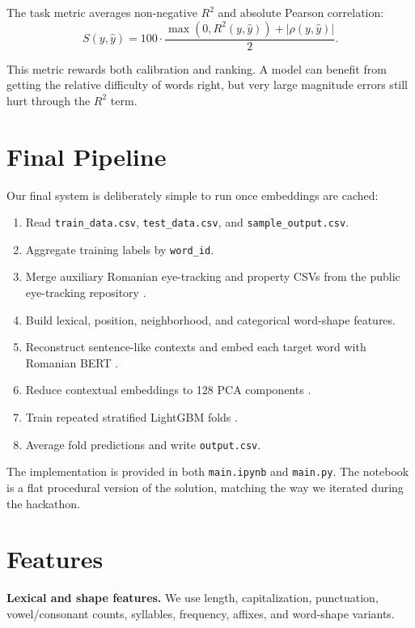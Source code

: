 \documentclass[10pt]{article}
\begin{document}
The task metric averages non-negative $R^2$ and absolute Pearson correlation:
\begin{equation}
  S(y,\hat y) =
  100 \cdot \frac{\max(0, R^2(y,\hat y)) + |\rho(y,\hat y)|}{2}.
\end{equation}

This metric rewards both calibration and ranking. A model can benefit from getting the relative difficulty of words right, but very large magnitude errors still hurt through the $R^2$ term.

\section{Final Pipeline}

Our final system is deliberately simple to run once embeddings are cached:

\begin{enumerate}
  \item Read \texttt{train\_data.csv}, \texttt{test\_data.csv}, and \texttt{sample\_output.csv}.
  \item Aggregate training labels by \texttt{word\_id}.
  \item Merge auxiliary Romanian eye-tracking and property CSVs from the public eye-tracking repository \citep{ana0101eyetracking}.
  \item Build lexical, position, neighborhood, and categorical word-shape features.
  \item Reconstruct sentence-like contexts and embed each target word with Romanian BERT \citep{dumitrescu2020birth,devlin2019bert}.
  \item Reduce contextual embeddings to 128 PCA components \citep{jolliffe2002pca,pedregosa2011scikit}.
  \item Train repeated stratified LightGBM folds \citep{ke2017lightgbm}.
  \item Average fold predictions and write \texttt{output.csv}.
\end{enumerate}

The implementation is provided in both \texttt{main.ipynb} and \texttt{main.py}. The notebook is a flat procedural version of the solution, matching the way we iterated during the hackathon.

\section{Features}

\textbf{Lexical and shape features.}
We use length, capitalization, punctuation, vowel/consonant counts, syllables, frequency, affixes, and word-shape variants.
\end{document}
